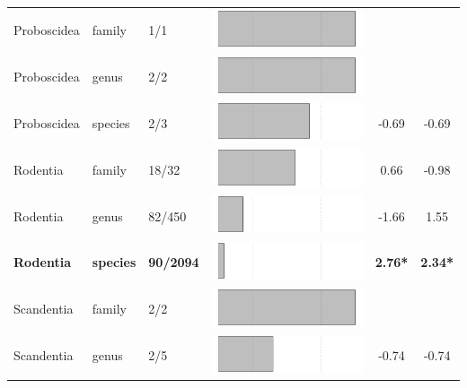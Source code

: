 \begin{longtable}{lL{1.8cm}C{2cm}lcc}
  Proboscidea & family & 1/1 & \includegraphics[width=0.20\linewidth, height=0.05\linewidth]{Supplementaries/Figures/Chapter2/Results_1c/Table_figures/bar67.pdf} &   &   \\ 
  Proboscidea & genus & 2/2 & \includegraphics[width=0.20\linewidth, height=0.05\linewidth]{Supplementaries/Figures/Chapter2/Results_1c/Table_figures/bar68.pdf} &   &   \\ 
  Proboscidea & species & 2/3 & \includegraphics[width=0.20\linewidth, height=0.05\linewidth]{Supplementaries/Figures/Chapter2/Results_1c/Table_figures/bar69.pdf} & -0.69 & -0.69 \\ 
  Rodentia & family & 18/32 & \includegraphics[width=0.20\linewidth, height=0.05\linewidth]{Supplementaries/Figures/Chapter2/Results_1c/Table_figures/bar70.pdf} & 0.66 & -0.98 \\ 
  Rodentia & genus & 82/450 & \includegraphics[width=0.20\linewidth, height=0.05\linewidth]{Supplementaries/Figures/Chapter2/Results_1c/Table_figures/bar71.pdf} & -1.66 & 1.55 \\ 
  \textbf{Rodentia} & \textbf{species} & \textbf{90/2094} & \includegraphics[width=0.20\linewidth, height=0.05\linewidth]{Supplementaries/Figures/Chapter2/Results_1c/Table_figures/bar72.pdf} & \textbf{2.76*} & \textbf{2.34*} \\ 
  Scandentia & family & 2/2 & \includegraphics[width=0.20\linewidth, height=0.05\linewidth]{Supplementaries/Figures/Chapter2/Results_1c/Table_figures/bar73.pdf} &   &   \\ 
  Scandentia & genus & 2/5 & \includegraphics[width=0.20\linewidth, height=0.05\linewidth]{Supplementaries/Figures/Chapter2/Results_1c/Table_figures/bar74.pdf} & -0.74 & -0.74 \\ 

\end{longtable}
